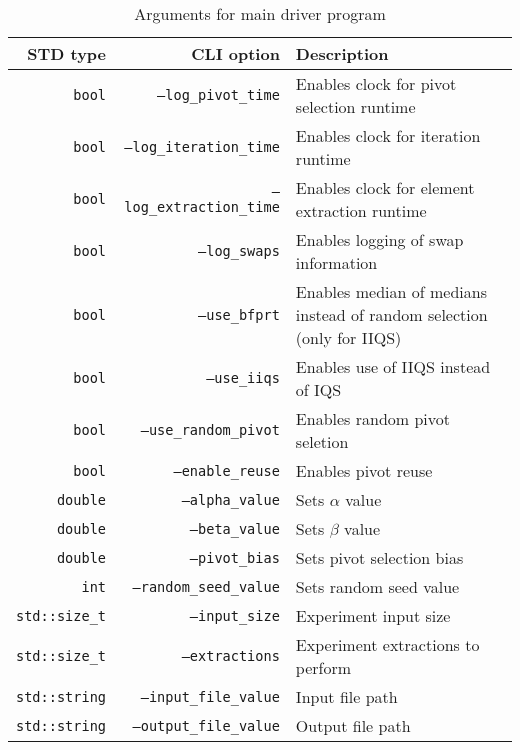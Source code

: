\begin{table}[!ht]
    \centering

    \begin{tabularx}{\linewidth}{|r|r|X|}
        \hline
        STD type & CLI option & Description \\
        \hline
        \texttt{bool} & \texttt{--log\_pivot\_time} & Enables clock for pivot selection runtime\\
        \hline
        \texttt{bool} & \texttt{--log\_iteration\_time} & Enables clock for iteration runtime \\
        \hline
        \texttt{bool} & \texttt{--log\_extraction\_time} & Enables clock for element extraction runtime\\
        \hline
        \texttt{bool} & \texttt{--log\_swaps} & Enables logging of swap information \\
        \hline
        \texttt{bool} & \texttt{--use\_bfprt} & Enables median of medians instead of random selection (only for IIQS) \\
        \hline
        \texttt{bool} & \texttt{--use\_iiqs} & Enables use of IIQS instead of IQS \\
        \hline
        \texttt{bool} & \texttt{--use\_random\_pivot} & Enables random pivot seletion \\
        \hline
        \texttt{bool} & \texttt{--enable\_reuse} & Enables pivot reuse \\
        \hline
        \texttt{double} & \texttt{--alpha\_value} & Sets $\alpha$ value \\
        \hline
        \texttt{double} & \texttt{--beta\_value} & Sets $\beta$ value \\
        \hline
        \texttt{double} & \texttt{--pivot\_bias} & Sets pivot selection bias \\
        \hline
        \texttt{int} & \texttt{--random\_seed\_value} & Sets random seed value \\
        \hline
        \texttt{std::size\_t} & \texttt{--input\_size} & Experiment input size \\
        \hline
        \texttt{std::size\_t} & \texttt{--extractions} & Experiment extractions to perform \\
        \hline
        \texttt{std::string} & \texttt{--input\_file\_value} & Input file path \\
        \hline
        \texttt{std::string} & \texttt{--output\_file\_value} & Output file path \\
        \hline    
    \end{tabularx}
    \caption{Arguments for main driver program}
    \label{TABLE:ARGUMENTS}
\end{table}

